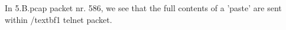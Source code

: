 In 5.B.pcap packet nr. 586, we see that the full contents of a 'paste' are sent within /textbf{1} telnet packet.

